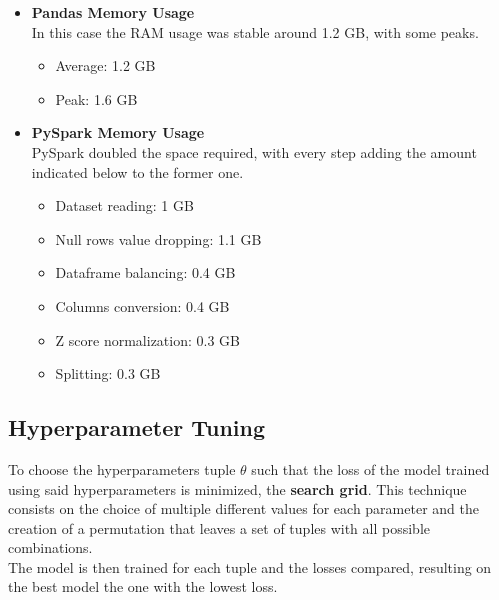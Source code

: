 \documentclass[
	letterpaper, %
	10pt, %
]{class}
\begin{document}
\begin{itemize}
    \item \textbf{Pandas Memory Usage}\\
    In this case the RAM usage was stable around 1.2 GB, with some peaks.
          \begin{itemize}
              \item Average: 1.2 GB
              \item Peak: 1.6 GB
          \end{itemize}
    \item \textbf{PySpark Memory Usage}\\
    PySpark doubled the space required, with every step adding the amount indicated below to the former one.
          \begin{itemize}
            \item Dataset reading: 1 GB
            \item Null rows value dropping: 1.1 GB
            \item Dataframe balancing: 0.4 GB
            \item Columns conversion: 0.4 GB
            \item Z score normalization: 0.3 GB
            \item Splitting: 0.3 GB
          \end{itemize}
\end{itemize}


\subsection{Hyperparameter Tuning}
To choose the hyperparameters tuple $\theta$ such that the loss of the model trained using said hyperparameters is minimized, the \textbf{search grid}.
This technique consists on the choice of multiple different values for each parameter and the creation of a permutation that leaves a set of tuples with all possible combinations.\\
The model is then trained for each tuple and the losses compared, resulting on the best model the one with the lowest loss.
\end{document}
